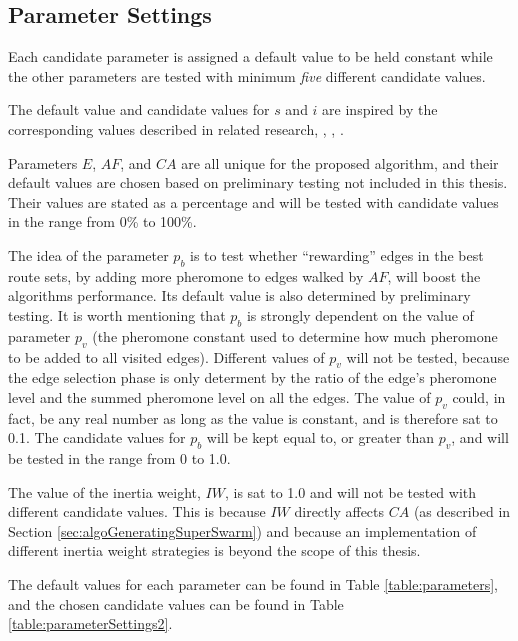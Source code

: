 \subsection{Parameter Settings}
\label{subsec:parameterSettings_setup}
Each candidate parameter is assigned a default value to be held constant while the other parameters are tested with minimum \textit{five} different candidate values. 

The default value and candidate values for $s$ and $i$ are inspired by the corresponding values described in related research\citep{salehi-nezhad07}, \citep{poorzahedy11}, \citep{sedighpour14}, \citep{kechagiopoulos14}.

Parameters $E$, $AF$, and $CA$ are all unique for the proposed algorithm, and their default values are chosen based on preliminary testing not included in this thesis. Their values are stated as a percentage and will be tested with candidate values in the range from 0\% to 100\%. %

The idea of the parameter $p_b$ is to test whether ``rewarding'' edges in the best route sets, by adding more pheromone to edges walked by $AF$, will boost the algorithms performance. Its default value is also determined by preliminary testing. It is worth mentioning that $p_ b$ is strongly dependent on the value of parameter $p_v$ (the pheromone constant used to determine how much pheromone to be added to all visited edges). Different values of $p_v$ will not be tested, because the edge selection phase is only determent by the ratio of the edge's pheromone level and the summed pheromone level on all the edges. The value of $p_v$ could, in fact, be any real number as long as the value is constant, and is therefore sat to 0.1. The candidate values for $p_b$ will be kept equal to, or greater than $p_v$, and will be tested in the range from 0 to 1.0. 

The value of the inertia weight, $IW$, is sat to 1.0 and will not be tested with different candidate values. This is because $IW$ directly affects $CA$ (as described in Section \vref{sec:algoGeneratingSuperSwarm}) and because an implementation of different inertia weight strategies is beyond the scope of this thesis. 

The default values for each parameter can be found in Table \vref{table:parameters}, and the chosen candidate values can be found in Table \vref{table:parameterSettings2}.

